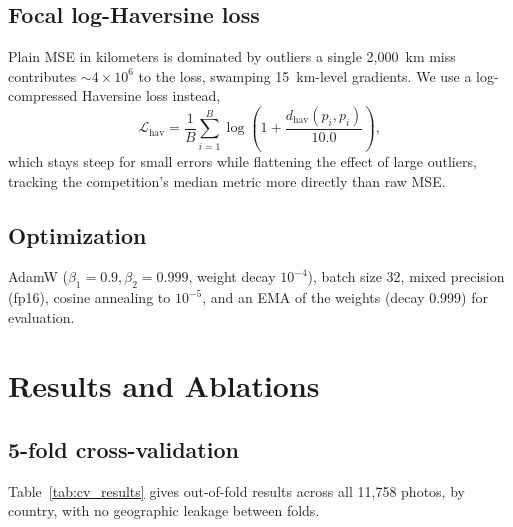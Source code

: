 \documentclass[10pt,twocolumn,a4paper]{article}
\begin{document}
\subsection{Focal log-Haversine loss}
Plain MSE in kilometers is dominated by outliers a single 2{,}000~km miss contributes $\sim4\times10^6$ to the loss, swamping 15~km-level gradients. We use a log-compressed Haversine loss instead,
\begin{equation}
\mathcal{L}_{\text{hav}} = \frac{1}{B}\sum_{i=1}^B \log\!\left(1+\frac{d_{\text{hav}}(\hat{p}_i,p_i)}{10.0}\right),
\end{equation}
which stays steep for small errors while flattening the effect of large outliers, tracking the competition's median metric more directly than raw MSE.

\subsection{Optimization}
AdamW ($\beta_1{=}0.9,\beta_2{=}0.999$, weight decay $10^{-4}$), batch size 32, mixed precision (fp16), cosine annealing to $10^{-5}$, and an EMA of the weights (decay 0.999) for evaluation.

\section{Results and Ablations}
\subsection{5-fold cross-validation}
Table~\ref{tab:cv_results} gives out-of-fold results across all 11{,}758 photos, by country, with no geographic leakage between folds.
\end{document}

